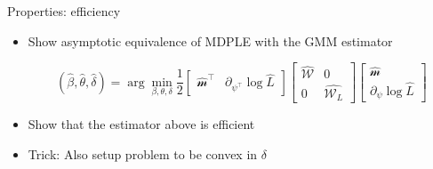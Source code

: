 \begin{frame}{Properties: efficiency}

\begin{itemize}
\item Show asymptotic equivalence of MDPLE with the GMM estimator

\begin{equation}
    (\hat{\beta},\hat{\theta},\hat{\delta}) = \arg\min_{\beta,\theta,\delta}\frac{1}{2}\begin{bmatrix}
\hat{\mathcal{m}}^\intercal & \partial_{\psi^\intercal}\log\hat{L}
\end{bmatrix}
\begin{bmatrix}
\hat{\mathcal{W}} & 0\\
0 & \hat{\mathcal{W}_L}
\end{bmatrix}
\begin{bmatrix}
\hat{\mathcal{m}} \\ \partial_{\psi}\log\hat{L}
\end{bmatrix}
\end{equation}

\item Show that the estimator above is efficient
\item  Trick: Also setup problem to be convex in $\delta$
\end{itemize}

\end{frame}

